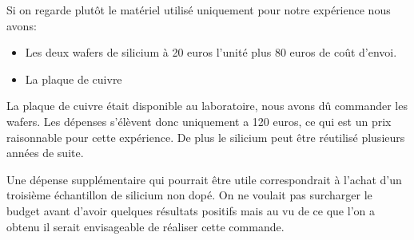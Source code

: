 \bigskip
Si on regarde plutôt le matériel utilisé uniquement pour notre expérience nous avons:

\begin{itemize}
  \item Les deux wafers de silicium à 20 euros l'unité plus 80 euros de coût d'envoi.
  \item La plaque de cuivre
\end{itemize}

La plaque de cuivre était disponible au laboratoire, nous avons dû commander les wafers. Les dépenses s'élèvent donc uniquement a 120 euros, ce qui est un prix raisonnable pour cette expérience. De plus le silicium peut être réutilisé plusieurs années de suite. 

\bigskip
Une dépense supplémentaire qui pourrait être utile correspondrait à l'achat d'un troisième échantillon de silicium non dopé. On ne voulait pas surcharger le budget avant d'avoir quelques résultats positifs mais au vu de ce que l'on a obtenu il serait envisageable de réaliser cette commande.
